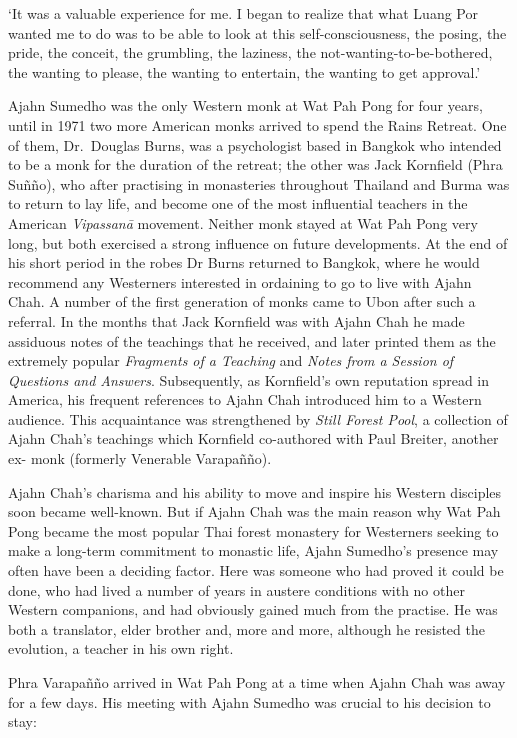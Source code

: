 `It was a valuable experience for me. I
began to realize that what Luang Por wanted me to do was to be able to
look at this self-consciousness, the posing, the pride, the conceit, the
grumbling, the laziness, the not-wanting-to-be-bothered, the wanting to
please, the wanting to entertain, the wanting to get approval.'

Ajahn Sumedho was the only Western monk at Wat Pah Pong for four years, 
until in 1971 two more American monks arrived to spend the Rains
Retreat. One of them, Dr.~Douglas Burns, was a psychologist based in
Bangkok who intended to be a monk for the duration of the retreat; the
other was Jack Kornfield (Phra Suñño), who after practising in
monasteries throughout Thailand and Burma was to return to lay life, and
become one of the most influential teachers in the American
\emph{Vipassanā} movement. Neither monk stayed at Wat Pah Pong very
long, but both exercised a strong influence on future developments. At
the end of his short period in the robes Dr Burns returned to Bangkok, 
where he would recommend any Westerners interested in ordaining to go to
live with Ajahn Chah. A number of the first generation of monks came to
Ubon after such a referral. In the months that Jack Kornfield was with
Ajahn Chah he made assiduous notes of the teachings that he received, 
and later printed them as the extremely popular \emph{Fragments of a
Teaching} and \emph{Notes from a Session of Questions and Answers}. 
Subsequently, as Kornfield's own reputation spread in America, his
frequent references to Ajahn Chah introduced him to a Western audience. 
This acquaintance was strengthened by \emph{Still Forest Pool}, a
collection of Ajahn Chah's teachings which Kornfield co-authored with
Paul Breiter, another ex- monk (formerly Venerable Varapañño). 

Ajahn Chah's charisma and his ability to move and inspire his Western
disciples soon became well-known. But if Ajahn Chah was the main reason
why Wat Pah Pong became the most popular Thai forest monastery for
Westerners seeking to make a long-term commitment to monastic life, 
Ajahn Sumedho's presence may often have been a deciding factor. Here was
someone who had proved it could be done, who had lived a number of years
in austere conditions with no other Western companions, and had
obviously gained much from the practise. He was both a translator, elder
brother and, more and more, although he resisted the evolution, a
teacher in his own right.

Phra Varapañño arrived in Wat Pah Pong at a
time when Ajahn Chah was away for a few days. His meeting with Ajahn
Sumedho was crucial to his decision to stay: 

